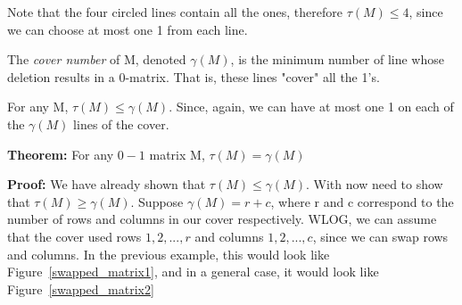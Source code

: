 \documentclass[11pt, letterpaper, oneside]{article}
\begin{document}
Note that the four circled lines contain all the ones, therefore $\tau(M) \leq 4$, since we can choose at most one 1 from each line.

The \textit{cover number} of M, denoted $\gamma(M)$, is the minimum number of line whose deletion results in a 0-matrix. That is, these lines "cover" all the 1's.

For any M, $\tau(M) \leq \gamma(M)$. Since, again, we can have at most one 1 on each of the $\gamma(M)$ lines of the cover.

\textbf{Theorem:} For any $0-1$ matrix M, $\tau(M) = \gamma(M)$

\textbf{Proof:} We have already shown that $\tau(M) \leq \gamma(M)$. With now need to show that $\tau(M) \geq \gamma(M)$. Suppose $\gamma(M)=r+c$, where r and c correspond to the number of rows and columns in our cover respectively. WLOG, we can assume that the cover used rows $1, 2, ..., r$ and columns $1, 2, ..., c$, since we can swap rows and columns. In the previous example, this would look like Figure~\ref{swapped_matrix1}, and in a general case, it would look like Figure~\ref{swapped_matrix2}
\end{document}
